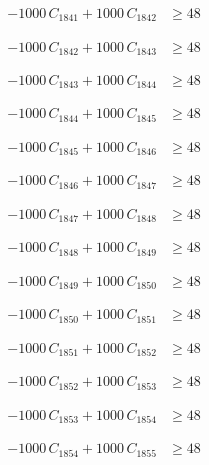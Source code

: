 \documentclass[a4paper,11pt]{article}
\begin{document}
\begin{align}
-1000\,C_{1841} + 1000\,C_{1842} &\geq 48 \nonumber
\end{align}

\begin{align}
-1000\,C_{1842} + 1000\,C_{1843} &\geq 48 \nonumber
\end{align}

\begin{align}
-1000\,C_{1843} + 1000\,C_{1844} &\geq 48 \nonumber
\end{align}

\begin{align}
-1000\,C_{1844} + 1000\,C_{1845} &\geq 48 \nonumber
\end{align}

\begin{align}
-1000\,C_{1845} + 1000\,C_{1846} &\geq 48 \nonumber
\end{align}

\begin{align}
-1000\,C_{1846} + 1000\,C_{1847} &\geq 48 \nonumber
\end{align}

\begin{align}
-1000\,C_{1847} + 1000\,C_{1848} &\geq 48 \nonumber
\end{align}

\begin{align}
-1000\,C_{1848} + 1000\,C_{1849} &\geq 48 \nonumber
\end{align}

\begin{align}
-1000\,C_{1849} + 1000\,C_{1850} &\geq 48 \nonumber
\end{align}

\begin{align}
-1000\,C_{1850} + 1000\,C_{1851} &\geq 48 \nonumber
\end{align}

\begin{align}
-1000\,C_{1851} + 1000\,C_{1852} &\geq 48 \nonumber
\end{align}

\begin{align}
-1000\,C_{1852} + 1000\,C_{1853} &\geq 48 \nonumber
\end{align}

\begin{align}
-1000\,C_{1853} + 1000\,C_{1854} &\geq 48 \nonumber
\end{align}

\begin{align}
-1000\,C_{1854} + 1000\,C_{1855} &\geq 48 \nonumber
\end{align}
\end{document}
